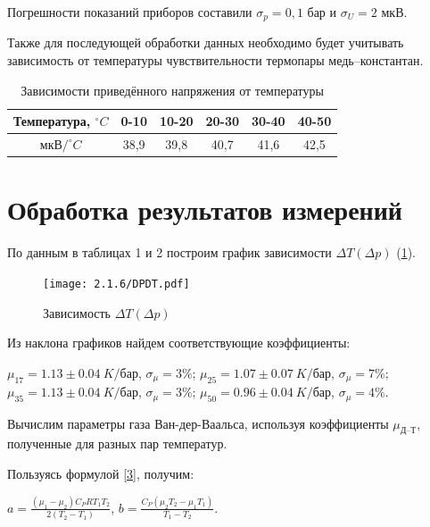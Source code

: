\documentclass[a4paper,12pt]{article} %
\begin{document}
Погрешности показаний приборов составили 
    $\sigma_p=0,1$ бар и 
    $\sigma_U=2$ мкВ.
    
Также для последующей обработки данных необходимо будет учитывать зависимость от температуры чувствительности термопары медь--константан.

\begin{table}[H]
    \begin{tabular}{|c|c|c|c|c|c|}
    \hline
    Температура, $^\circ C$ & 0-10 & 10-20 & 20-30 & 30-40 & 40-50 \\ \hline
    мкВ$/^\circ C$ & 38,9 & 39,8 & 40,7 & 41,6 & 42,5 \\ \hline
    \end{tabular}
    \label{sensitivity}
    \caption {Зависимости приведённого напряжения от температуры}
\end{table}

\section{Обработка результатов измерений}

По данным в таблицах 1 и 2 построим график зависимости $\Delta T(\Delta p)$ (\ref{DTDP}).

\begin{figure}[H]
    \centering
    \texttt{[image: 2.1.6/DPDT.pdf]}
    \caption{Зависимость $\Delta T(\Delta p)$}
    \label{DTDP}
\end{figure}

Из наклона графиков найдем соответствующие коэффициенты:

\begin{center}
    $\displaystyle \mu_{17} = 1.13 \pm 0.04\  K/$бар, $\displaystyle \sigma_{\mu} = 3\%$;\break
    $\displaystyle \mu_{25} = 1.07 \pm 0.07\  K/$бар, $\displaystyle \sigma_{\mu} = 7\%$;\break
    $\displaystyle \mu_{35} = 1.13 \pm 0.04\  K/$бар, $\displaystyle \sigma_{\mu} = 3\%$;\break
    $\displaystyle \mu_{50} = 0.96 \pm 0.04\  K/$бар, $\displaystyle \sigma_{\mu} = 4\%$.\break
\end{center}

Вычислим параметры газа Ван-дер-Ваальса, используя коэффициенты $ \mu_\text{Д--Т} $, полученные для разных пар температур.

Пользуясь формулой \eqref{3}, получим:
\begin{center}
    $\displaystyle a = \frac{\left(\mu_1 - \mu_2\right)C_PRT_1T_2}{2\left(T_2-T_1\right)}$,\break\break
	$\displaystyle b = \frac{C_P(\mu_2T_2-\mu_1T_1)}{T_1-T_2}. $

\end{center}
\end{document}
